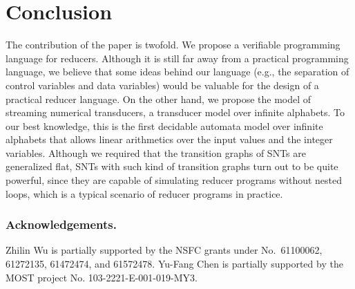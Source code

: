 	
\section{Conclusion}
\label{sec:conclusion}


The contribution of the paper is twofold. We propose a verifiable programming language for reducers. Although it is still far away from a practical programming language, we believe that some ideas behind our language (e.g., the separation of control variables and data variables) would be valuable for the design of a practical reducer language. On the other hand, we propose the model of streaming numerical transducers, a transducer model over infinite alphabets. To our best knowledge, this is the first decidable automata model over infinite alphabets that allows linear arithmetics over the input values and the integer variables. Although we required that the transition graphs of SNTs are generalized flat,  SNTs with such kind of transition graphs turn out to be quite powerful, since they are capable of simulating reducer programs without nested loops, which is a typical scenario of reducer programs in practice.


\subsubsection{Acknowledgements.} Zhilin Wu is partially supported by the NSFC grants under No.\ 61100062, 61272135, 61472474, and 61572478. Yu-Fang Chen is partially supported by the MOST project No. 103-2221-E-001-019-MY3.


